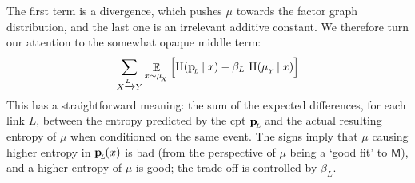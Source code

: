 \documentclass{article}
\newcommand{\bp}[1][L]{\mat{p}_{\!_#1\!}}
\newcommand{\sfM}{\mathsf M}
\newcommand{\alle}[1][L]{_{ X \xrightarrow{\!\!#1} Y }}
\begin{document}
	
	The first term is a divergence, which pushes $\mu$ towards the factor graph distribution, and the last one is an irrelevant additive constant. We therefore turn our attention to the somewhat opaque middle term:
	\[ \sum\alle \E_{x \sim \mu_{\!_X}} \Big[ \H(\bp \mid x) - \beta_L \ \H(\mu_{_Y}\! \mid x) \Big] \]
	This has a straightforward meaning: the sum of the expected differences, for each link $L$, between the entropy predicted by the cpt $\bp$ and the actual resulting entropy of $\mu$ when conditioned on the same event.
	The signs imply that $\mu$ causing higher entropy in $\bp(x)$ is bad (from the perspective of $\mu$ being a `good fit' to $\sfM$), and a higher entropy of $\mu$ is good; the trade-off is controlled by $\beta_L$. 
	
	

	
\end{document}
